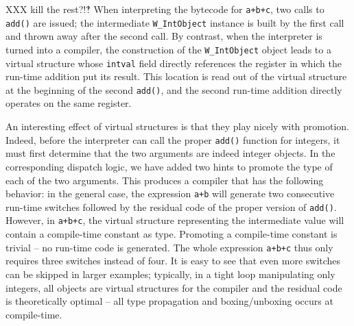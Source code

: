 XXX kill the rest?!‽
When interpreting the bytecode for \texttt{a+b+c}, two calls to \texttt{add()} are
issued; the intermediate \texttt{W\_IntObject} instance is built by the first
call and thrown away after the second call.  By contrast, when the
interpreter is turned into a compiler, the construction of the
\texttt{W\_IntObject} object leads to a virtual structure whose \texttt{intval}
field directly references the register in which the run-time addition
put its result.  This location is read out of the virtual structure at
the beginning of the second \texttt{add()}, and the second run-time addition
directly operates on the same register.

An interesting effect of virtual structures is that they play nicely with
promotion.  Indeed, before the interpreter can call the proper \texttt{add()}
function for integers, it must first determine that the two arguments
are indeed integer objects.  In the corresponding dispatch logic, we
have added two hints to promote the type of each of the two arguments.
This produces a compiler that has the following behavior: in the general
case, the expression \texttt{a+b} will generate two consecutive run-time
switches followed by the residual code of the proper version of
\texttt{add()}.  However, in \texttt{a+b+c}, the virtual structure representing
the intermediate value will contain a compile-time constant as type.
Promoting a compile-time constant is trivial – no run-time code is
generated.  The whole expression \texttt{a+b+c} thus only requires three
switches instead of four.  It is easy to see that even more switches can
be skipped in larger examples; typically, in a tight loop manipulating
only integers, all objects are virtual structures for the compiler and
the residual code is theoretically optimal – all type propagation and
boxing/unboxing occurs at compile-time.
